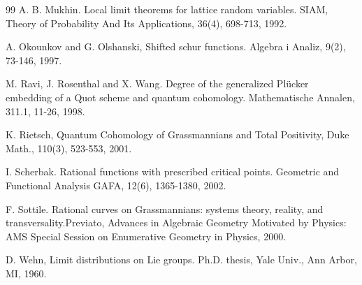 \documentclass[10pt,11pt]{amsart}%
\begin{document}
\begin{thebibliography}{99}
A. B. Mukhin. Local limit theorems for lattice random variables. SIAM, Theory of Probability And Its Applications, 36(4), 698-713, 1992.

 A. Okounkov and G. Olshanski,  Shifted schur functions. Algebra i Analiz, 9(2), 73-146, 1997.

 M. Ravi, J. Rosenthal and X. Wang. Degree of the generalized Plücker embedding of a Quot scheme and quantum cohomology. Mathematische Annalen, 311.1, 11-26, 1998.

K. Rietsch, Quantum Cohomology of Grassmannians and Total Positivity, Duke Math., 110(3), 523-553, 2001.

 I. Scherbak. Rational functions with prescribed critical points. Geometric and Functional Analysis GAFA, 12(6), 1365-1380, 2002.

F. Sottile. Rational curves on Grassmannians: systems theory, reality, and transversality.Previato, Advances in Algebraic Geometry Motivated by Physics: AMS Special Session on Enumerative Geometry in Physics, 2000.

 D. Wehn, Limit distributions on Lie groups. Ph.D. thesis, Yale Univ., Ann Arbor, MI, 1960.


\end{thebibliography}

\pagebreak

\printnomenclature
\end{document}
